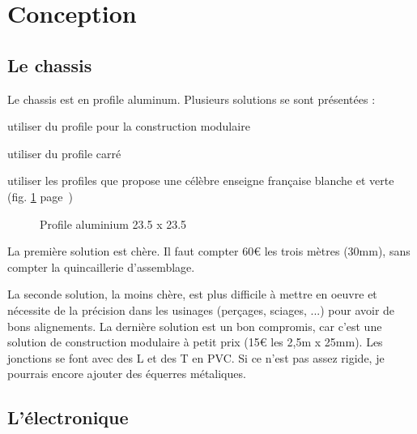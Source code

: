 \section{Conception}
\subsection{Le chassis}
Le chassis est en profile aluminum. Plusieurs solutions se sont %
présentées :\begin{dinglist}{71}%
\item{utiliser du profile pour la construction modulaire}%
\item{utiliser du profile carré}%
\item{utiliser les profiles que propose une célèbre enseigne française %
blanche et verte (fig. \ref{profile} page~\pageref{profile})}
\end{dinglist}%
\par%
\begin{figure}%
   \caption{\label{profile} Profile aluminium 23.5 x 23.5}
\end{figure} %
La première solution est chère. Il faut compter 60\euro{} les trois mètres %
(30mm), sans compter la quincaillerie d'assemblage. \par%
La seconde solution, la moins chère, est plus difficile à mettre en %
oeuvre et nécessite de la précision dans les usinages (perçages, sciages, %
...) pour avoir de bons alignements.%
La dernière solution est un bon compromis, car c'est une solution de %
construction modulaire à petit prix (15\euro{} les 2,5m x 25mm). Les jonctions %
se font avec des L et des T en PVC. Si ce n'est pas assez rigide, je %
pourrais encore ajouter des équerres métaliques.
\subsection{L'électronique}
